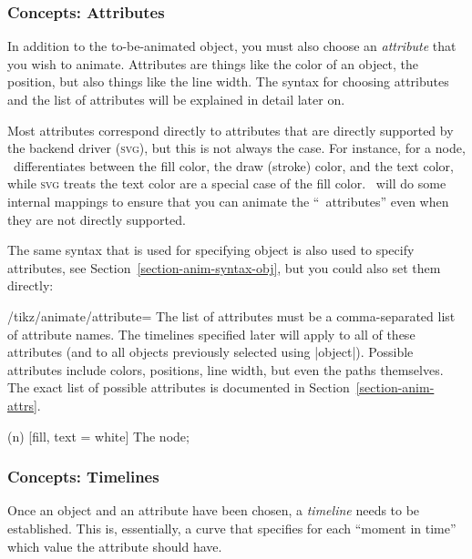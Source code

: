 \subsubsection{Concepts: Attributes}

In addition to the to-be-animated object, you must also choose an
\emph{attribute} that you wish to animate. Attributes are things like
the color of an object, the position, but also things like the line
width. The syntax for choosing attributes and the list of attributes
will be explained in detail later on.

Most attributes correspond directly to attributes that are directly
supported by the backend driver (\textsc{svg}), but this is not always
the case. For instance, for a node, \tikzname\ differentiates between
the fill color, the draw (stroke) color, and the text color, while
\textsc{svg} treats the text color are a special case of the fill
color. \tikzname\ will do some internal mappings to ensure that you
can animate the ``\tikzname\ attributes'' even when they are not
directly supported.

The same syntax that is used for specifying object is also used to
specify attributes, see Section~\ref{section-anim-syntax-obj}, but you
could also set them directly:

\begin{key}{/tikz/animate/attribute=}
  The list of attributes must be a comma-separated list of attribute
  names. The timelines specified later will apply to all of these
  attributes (and to all objects previously selected using
  |object|). Possible attributes include colors, positions, line
  width, but even the paths themselves. The exact list of possible
  attributes is documented in Section~\ref{section-anim-attrs}.

\begin{codeexample}[animation list={0.5,1,1.5,2}]
\tikz [animate = {object = n, attribute = fill, 0s = "red", 2s = "blue",
                                                begin on = click }] 
  \node (n) [fill, text = white] {The node}; 
\end{codeexample}

\end{key}


\subsubsection{Concepts: Timelines}

Once an object and an attribute have been chosen, a \emph{timeline}
needs to be established. This is, essentially, a curve that specifies
for each ``moment in time'' which value the attribute should have.

